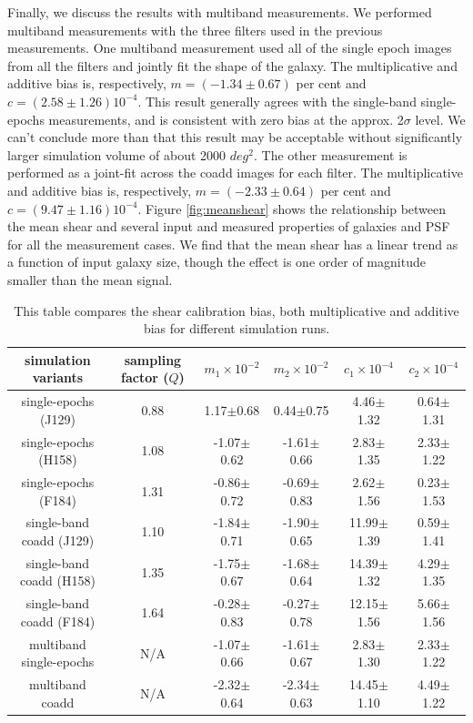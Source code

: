 \documentclass[fleqn,usenatbib]{mnras}
\begin{document}
Finally, we discuss the results with multiband measurements. We performed multiband measurements with the three filters used in the previous measurements. One multiband measurement used all of the single epoch images from all the filters and jointly fit the shape of the galaxy. The multiplicative and additive bias is, respectively, $m=(-1.34\pm0.67)$ per cent and $c=(2.58\pm1.26)10^{-4}$. This result generally agrees with the single-band single-epochs measurements, and is consistent with zero bias at the approx. 2$\sigma$ level. We can't conclude more than that this result may be acceptable without significantly larger simulation volume of about 2000 $deg^{2}$. The other measurement is performed as a joint-fit across the coadd images for each filter. The multiplicative and additive bias is, respectively, $m=(-2.33\pm0.64)$ per cent and $c=(9.47\pm1.16)10^{-4}$. Figure \ref{fig:meanshear} shows the relationship between the mean shear and several input and measured properties of galaxies and PSF for all the measurement cases. We find that the mean shear has a linear trend as a function of input galaxy size, though the effect is one order of magnitude smaller than the mean signal.


\begin{table}
	\centering
	\label{tab:bias_summary}
	\begin{tabular}[width=\textwidth]{ c|c|c|c|c|c } 
		\hline
		simulation variants & sampling factor ($Q$) & $m_{1}\times10^{-2}$ & $m_{2}\times10^{-2}$ & $c_{1}\times10^{-4}$ & $c_{2}\times10^{-4}$\\
		\hline
		single-epochs (J129) & 0.88 & 1.17$\pm$0.68 & 0.44$\pm$0.75 & 4.46$\pm$1.32 & 0.64$\pm$1.31\\
		single-epochs (H158) & 1.08 & -1.07$\pm$0.62 & -1.61$\pm$0.66 & 2.83$\pm$1.35 & 2.33$\pm$1.22\\
		single-epochs (F184) & 1.31 & -0.86$\pm$0.72 & -0.69$\pm$0.83 & 2.62$\pm$1.56 & 0.23$\pm$1.53\\
		\hline
		single-band coadd (J129) & 1.10 & -1.84$\pm$0.71 & -1.90$\pm$0.65 & 11.99$\pm$1.39 & 0.59$\pm$1.41\\
		single-band coadd (H158) & 1.35 & -1.75$\pm$0.67 & -1.68$\pm$0.64 & 14.39$\pm$1.32 & 4.29$\pm$1.35\\
		single-band coadd (F184) & 1.64 & -0.28$\pm$0.83 & -0.27$\pm$0.78 & 12.15$\pm$1.56 & 5.66$\pm$1.56\\
		\hline
		multiband single-epochs & N/A & -1.07$\pm$0.66 & -1.61$\pm$0.67 & 2.83$\pm$1.30 & 2.33$\pm$1.22 \\
		multiband coadd & N/A & -2.32$\pm$0.64 & -2.34$\pm$0.63 & 14.45$\pm$1.10 & 4.49$\pm$1.22\\
		
		\hline
	\end{tabular}
	\caption{This table compares the shear calibration bias, both multiplicative and additive bias for different simulation runs.}
	\label{tab:result}
\end{table}
\end{document}
